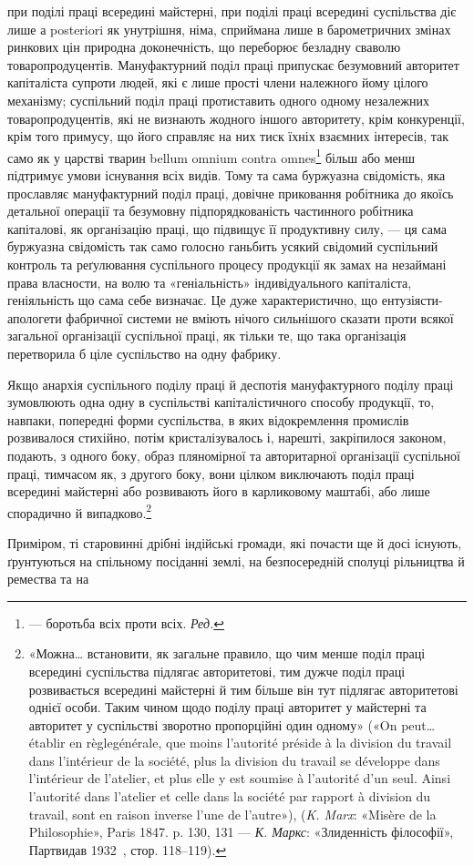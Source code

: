 \parcont{}  %
при поділі праці всередині майстерні, при поділі праці всередині
суспільства діє лише а posteriori як унутрішня, німа, сприймана
лише в барометричних змінах ринкових цін природна доконечність,
що переборює безладну сваволю товаропродуцентів. Мануфактурний
поділ праці припускає безумовний авторитет капіталіста
супроти людей, які є лише прості члени належного йому цілого
механізму; суспільний поділ праці протиставить одного одному
незалежних товаропродуцентів, які не визнають жодного іншого
авторитету, крім конкуренції, крім того примусу, що його справляє
на них тиск їхніх взаємних інтересів, так само як у царстві
тварин bellum omnium contra omnes\footnote*{
— боротьба всіх проти всіх. \emph{Ред.}
} більш або менш підтримує
умови існування всіх видів. Тому та сама буржуазна свідомість,
яка прославляє мануфактурний поділ праці, довічне приковання
робітника до якоїсь детальної операції та безумовну підпорядкованість
частинного робітника капіталові, як організацію
праці, що підвищує її продуктивну силу, — ця сама буржуазна
свідомість так само голосно ганьбить усякий свідомий суспільний
контроль та реґулювання суспільного процесу продукції як замах
на незаймані права власности, на волю та «геніальність» індивідуального
капіталіста, геніяльність що сама себе визначає.
Це дуже характеристично, що ентузіясти-апологети фабричної
системи не вміють нічого сильнішого сказати проти всякої загальної
організації суспільної праці, як тільки те, що така організація
перетворила б ціле суспільство на одну фабрику.

Якщо анархія суспільного поділу праці й деспотія мануфактурного
поділу праці зумовлюють одна одну в суспільстві капіталістичного
способу продукції, то, навпаки, попередні форми
суспільства, в яких відокремлення промислів розвивалося стихійно,
потім кристалізувалось і, нарешті, закріпилося законом,
подають, з одного боку, образ пляномірної та авторитарної
організації суспільної праці, тимчасом як, з другого боку, вони
цілком виключають поділ праці всередині майстерні або розвивають
його в карликовому маштабі, або лише спорадично й випадково.\footnote{
«Можна\dots{} встановити, як загальне правило, що чим менше поділ
праці всередині суспільства підлягає авторитетові, тим дужче поділ
праці розвивається всередині майстерні й тим більше він тут підлягає
авторитетові однієї особи. Таким чином щодо поділу праці авторитет
у майстерні та авторитет у суспільстві зворотно пропорційні один
одному» («On peut\dots{} établir en règlegénérale, que moins l’autorité préside
à la division du travail dans l’intérieur de la société, plus la division du
travail se développe dans l’intérieur de l’atelier, et plus elle y est soumise
à l’autorité d’un seul. Ainsi l’autorité dans l’atelier et celle dans la société
par rapport à division du travail, sont en raison inverse l’une de l’autre»),
(\emph{K. Marx}: «Misère de la Philosophie», Paris 1847. p. 130, 131 — \emph{К. Маркс}:
«Злиденність філософії», Партвидав 1932~, стор. 118--119).
}

Приміром, ті старовинні дрібні індійські громади, які почасти
ще й досі існують, ґрунтуються на спільному посіданні
землі, на безпосередній сполуці рільництва й ремества та на
\parbreak{}  %
